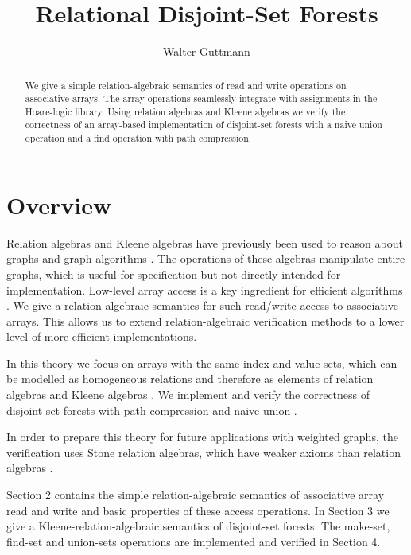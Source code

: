 \documentclass[11pt,a4paper]{article}
\begin{document}
\title{Relational Disjoint-Set Forests}
\author{Walter Guttmann}
\maketitle

\begin{abstract}
  We give a simple relation-algebraic semantics of read and write operations on associative arrays.
  The array operations seamlessly integrate with assignments in the Hoare-logic library.
  Using relation algebras and Kleene algebras we verify the correctness of an array-based implementation of disjoint-set forests with a naive union operation and a find operation with path compression.
\end{abstract}

\tableofcontents

\section{Overview}

Relation algebras and Kleene algebras have previously been used to reason about graphs and graph algorithms \cite{BackhouseCarre1975,Berghammer1999,BerghammerStruth2010,BerghammerKargerWolf1998,GondranMinoux2008,HoefnerMoeller2012,Moeller1993}.
The operations of these algebras manipulate entire graphs, which is useful for specification but not directly intended for implementation.
Low-level array access is a key ingredient for efficient algorithms \cite{CormenLeisersonRivest1990}.
We give a relation-algebraic semantics for such read/write access to associative arrays.
This allows us to extend relation-algebraic verification methods to a lower level of more efficient implementations.

In this theory we focus on arrays with the same index and value sets, which can be modelled as homogeneous relations and therefore as elements of relation algebras and Kleene algebras \cite{Kozen1994,Tarski1941}.
We implement and verify the correctness of disjoint-set forests with path compression and naive union \cite{CormenLeisersonRivest1990,GallerFisher1964,Tarjan1975}.

In order to prepare this theory for future applications with weighted graphs, the verification uses Stone relation algebras, which have weaker axioms than relation algebras \cite{Guttmann2018c}.

Section 2 contains the simple relation-algebraic semantics of associative array read and write and basic properties of these access operations.
In Section 3 we give a Kleene-relation-algebraic semantics of disjoint-set forests.
The make-set, find-set and union-sets operations are implemented and verified in Section 4.
\end{document}
